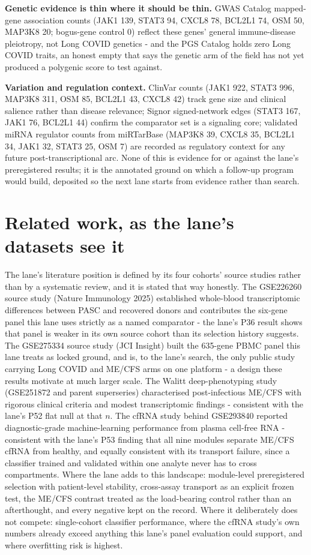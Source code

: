\documentclass[11pt,a4paper]{article}
\begin{document}
\textbf{Genetic evidence is thin where it should be thin.} GWAS Catalog
mapped-gene association counts (JAK1 139, STAT3 94, CXCL8 78, BCL2L1 74,
OSM 50, MAP3K8 20; bogus-gene control 0) reflect these genes' general
immune-disease pleiotropy, not Long COVID genetics - and the PGS Catalog
holds zero Long COVID traits, an honest empty that says the genetic arm of
the field has not yet produced a polygenic score to test against.

\textbf{Variation and regulation context.} ClinVar counts (JAK1 922, STAT3
996, MAP3K8 311, OSM 85, BCL2L1 43, CXCL8 42) track gene size and clinical
salience rather than disease relevance; Signor signed-network edges (STAT3
167, JAK1 76, BCL2L1 44) confirm the comparator set is a signaling core;
validated miRNA regulator counts from miRTarBase (MAP3K8 39, CXCL8 35,
BCL2L1 34, JAK1 32, STAT3 25, OSM 7) are recorded as regulatory context for
any future post-transcriptional arc. None of this is evidence for or against
the lane's preregistered results; it is the annotated ground on which a
follow-up program would build, deposited so the next lane starts from
evidence rather than search.


\section{Related work, as the lane's datasets see it}
The lane's literature position is defined by its four cohorts' source studies
rather than by a systematic review, and it is stated that way honestly.
The GSE226260 source study (Nature Immunology 2025) established whole-blood
transcriptomic differences between PASC and recovered donors and contributes
the six-gene panel this lane uses strictly as a named comparator - the lane's
P36 result shows that panel is weaker in its own source cohort than its
selection history suggests. The GSE275334 source study (JCI Insight) built
the 635-gene PBMC panel this lane treats as locked ground, and is, to the
lane's search, the only public study carrying Long COVID and ME/CFS arms
on one platform - a design these results motivate at much larger scale. The
Walitt deep-phenotyping study (GSE251872 and parent superseries)
characterised post-infectious ME/CFS with rigorous clinical criteria and
modest transcriptomic findings - consistent with the lane's P52 flat null at
that $n$. The cfRNA study behind GSE293840 reported diagnostic-grade
machine-learning performance from plasma cell-free RNA - consistent with the
lane's P53 finding that all nine modules separate ME/CFS cfRNA from healthy,
and equally consistent with its transport failure, since a classifier trained
and validated within one analyte never has to cross compartments. Where the
lane adds to this landscape: module-level preregistered selection with
patient-level stability, cross-assay transport as an explicit frozen test,
the ME/CFS contrast treated as the load-bearing control rather than an
afterthought, and every negative kept on the record. Where it deliberately
does not compete: single-cohort classifier performance, where the cfRNA
study's own numbers already exceed anything this lane's panel evaluation
could support, and where overfitting risk is highest.
\end{document}
